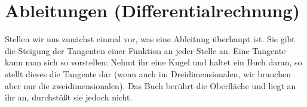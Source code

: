 \section{Ableitungen (Differentialrechnung)}
	Stellen wir uns zunächst einmal vor, was eine Ableitung überhaupt ist. Sie gibt
	die Steigung der Tangenten einer Funktion an jeder Stelle an. Eine Tangente
	kann man sich so vorstellen: Nehmt ihr eine Kugel und haltet ein Buch daran, so
	stellt dieses die Tangente dar (wenn auch im Dreidimensionalen, wir brauchen
	aber nur die zweidimensionalen). Das Buch berührt die Oberfläche und liegt an
	ihr an, durchstößt sie jedoch nicht.
	

	

	

	

	

	

	
